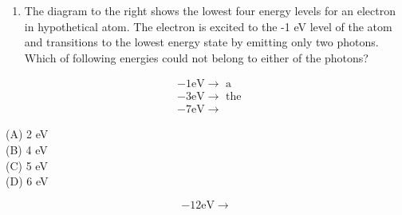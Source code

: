 \begin{enumerate}
\begin{enumerate}
A) $V_{\text {new }}>2 V_{\text {stop }}$\\
B) $V_{\text {new }}=2 V_{\text {stop }}$\\
C) $\mathrm{V}_{\text {stop }}<\mathrm{V}_{\text {new }}<2 \mathrm{~V}_{\text {stop }}$\\
D) It is indeterminate from the given information
  \item The diagram to the right shows the lowest four energy levels for an electron in hypothetical atom. The electron is excited to the -1 eV level of the atom and transitions to the lowest energy state by emitting only two photons. Which of following energies could not belong to either of the photons?
\end{enumerate}

$$
\begin{aligned}
& -1 \mathrm{eV} \longrightarrow \text { a } \\
& -3 \mathrm{eV} \longrightarrow \text { the } \\
& -7 \mathrm{eV} \longrightarrow
\end{aligned}
$$

(A) 2 eV\\
(B) 4 eV\\
(C) 5 eV\\
(D) 6 eV

$$
-12 \mathrm{eV} \longrightarrow
$$


\end{enumerate}
